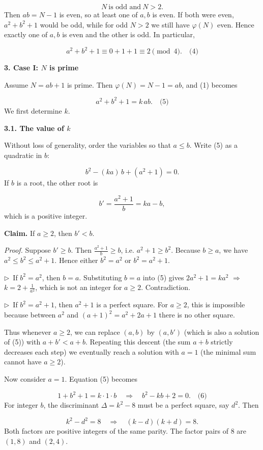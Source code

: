 \documentclass{llmxive}
\providecommand{\solutionheading}[1]{\par\smallskip\noindent\textbf{#1}\par}
\providecommand{\compactbullet}[1]{\par\noindent$\triangleright$~#1\par}
\begin{document}
\[
N\ \text{is odd and}\ N>2.
\]
Then \(ab = N-1\) is even, so at least one of \(a,b\) is even. If both were even, \(a^{2}+b^{2}+1\) would be odd, while for odd \(N>2\) we still have \(\varphi(N)\) even. Hence exactly one of \(a,b\) is even and the other is odd. In particular,\par
\[
a^{2}+b^{2}+1 \equiv 0+1+1 \equiv 2 \pmod{4}. \quad\text{(4)}
\]
\smallskip
\solutionheading{3. Case I: \(N\) is prime}
Assume \(N = ab+1\) is prime. Then \(\varphi(N) = N-1 = ab\), and (1) becomes\par
\[
a^{2}+b^{2}+1 = k\,ab. \quad\text{(5)}
\]
We first determine \(k\).\par
\solutionheading{3.1. The value of \(k\)}
Without loss of generality, order the variables so that \(a \le b\). Write (5) as a quadratic in \(b\):\par
\[
b^{2} - (k a)\,b + (a^{2}+1) = 0.
\]
If \(b\) is a root, the other root is\par
\[
b' = \frac{a^{2}+1}{b} = k a - b,
\]
which is a positive integer.\par
\textbf{Claim.} If \(a \ge 2\), then \(b' < b\).\par
\emph{Proof.} Suppose \(b' \ge b\). Then \(\frac{a^{2}+1}{b} \ge b\), i.e. \(a^{2}+1 \ge b^{2}\). Because \(b \ge a\), we have \(a^{2} \le b^{2} \le a^{2}+1\). Hence either \(b^{2}=a^{2}\) or \(b^{2}=a^{2}+1\).\par
\compactbullet{If \(b^{2}=a^{2}\), then \(b=a\). Substituting \(b=a\) into (5) gives \(2a^{2}+1 = k a^{2}\) \(\Rightarrow\) \(k = 2 + \frac{1}{a^{2}}\), which is not an integer for \(a \ge 2\). Contradiction.}
\compactbullet{If \(b^{2}=a^{2}+1\), then \(a^{2}+1\) is a perfect square. For \(a \ge 2\), this is impossible because between \(a^{2}\) and \((a+1)^{2}=a^{2}+2a+1\) there is no other square.}
Thus whenever \(a \ge 2\), we can replace \((a,b)\) by \((a,b')\) (which is also a solution of (5)) with \(a+b' < a+b\). Repeating this descent (the sum \(a+b\) strictly decreases each step) we eventually reach a solution with \(a=1\) (the minimal sum cannot have \(a \ge 2\)).\par
Now consider \(a=1\). Equation (5) becomes\par
\[
1 + b^{2} + 1 = k \cdot 1 \cdot b \quad\Longrightarrow\quad b^{2} - k b + 2 = 0. \quad\text{(6)}
\]
For integer \(b\), the discriminant \(\Delta = k^{2}-8\) must be a perfect square, say \(d^{2}\). Then\par
\[
k^{2} - d^{2} = 8 \quad\Longrightarrow\quad (k-d)(k+d)=8.
\]
Both factors are positive integers of the same parity. The factor pairs of \(8\) are \((1,8)\) and \((2,4)\).\par
\end{document}
